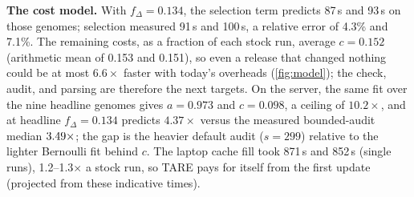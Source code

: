 \documentclass[letterpaper,twocolumn,10pt]{article}
\theoremstyle{definition}
\newcommand{\sys}{TARE\xspace}
\newcommand{\sys}{PARE\xspace}
\begin{document}
\textbf{The cost model.} With $f_\Delta = 0.134$, the selection term predicts 87\,s and 93\,s on those genomes; selection measured 91\,s and 100\,s, a
relative error of 4.3\% and 7.1\%. The remaining costs, as a fraction of each stock run, average $c = 0.152$ (arithmetic mean of 0.153 and 0.151), so even a release that changed
nothing could be at most $6.6\times$ faster with today's overheads (\cref{fig:model}); the check, audit, and parsing are
therefore the next targets. On the server, the same fit over the nine headline genomes gives $a = 0.973$ and
$c = 0.098$, a ceiling of $10.2\times$, and at headline $f_\Delta{=}0.134$ predicts $4.37\times$ versus the measured
bounded\nobreakdash-audit median $3.49\times$; the gap is the heavier default audit ($s{=}299$) relative to the
lighter Bernoulli fit behind $c$.
The laptop cache fill took 871\,s and 852\,s (single runs),
1.2--1.3$\times$ a stock run, so \sys pays for itself from the first update (projected from these indicative times).
\end{document}
